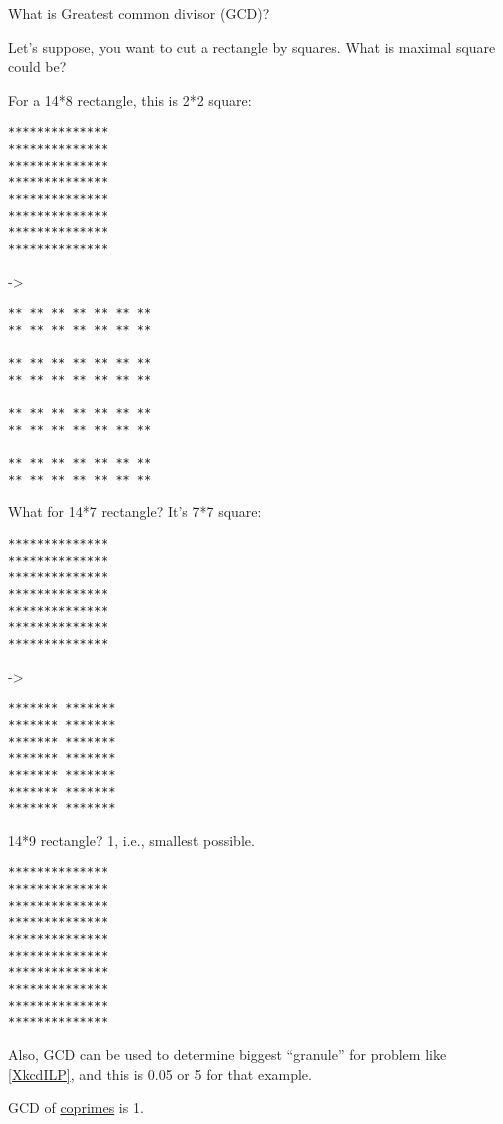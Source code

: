 
What is Greatest common divisor (\ac{GCD})?

Let's suppose, you want to cut a rectangle by squares. What is maximal square could be?

For a 14*8 rectangle, this is 2*2 square:

\begin{lstlisting}
**************
**************
**************
**************
**************
**************
**************
**************
\end{lstlisting}

->

\begin{lstlisting}
** ** ** ** ** ** **
** ** ** ** ** ** **
                  
** ** ** ** ** ** **
** ** ** ** ** ** **
                  
** ** ** ** ** ** **
** ** ** ** ** ** **
                  
** ** ** ** ** ** **
** ** ** ** ** ** **
\end{lstlisting}

What for 14*7 rectangle? It's 7*7 square:

\begin{lstlisting}
**************
**************
**************
**************
**************
**************
**************
\end{lstlisting}

->

\begin{lstlisting}
******* *******
******* *******
******* *******
******* *******
******* *******
******* *******
******* *******
\end{lstlisting}

14*9 rectangle? 1, i.e., smallest possible.

\begin{lstlisting}
**************
**************
**************
**************
**************
**************
**************
**************
**************
**************
\end{lstlisting}

Also, GCD can be used to determine biggest ``granule'' for problem like \ref{XkcdILP}, and this is 0.05 or 5 for that example.

GCD of \href{https://yurichev.com/blog/RSA/}{coprimes} is 1.

\myhrule{}

